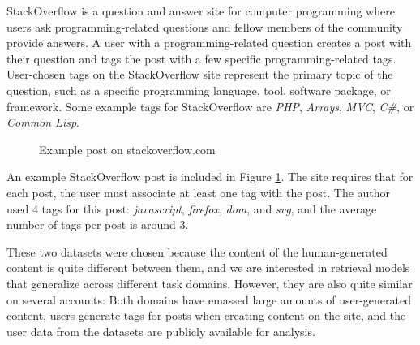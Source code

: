 \documentclass[man,floatsintext]{apa6}
\begin{document}
StackOverflow is a question and answer site for computer programming where users ask programming-related questions and fellow members of the community provide answers.
A user with a programming-related question creates a post with their question and tags the post with a few specific programming-related tags. 
User-chosen tags on the StackOverflow site represent the primary topic of the question, such as a specific programming language, tool, software package, or framework.
Some example tags for StackOverflow are \emph{PHP}, \emph{Arrays}, \emph{MVC}, \emph{C\#}, or \emph{Common Lisp}.

\begin{figure}[!htbp]
  \caption{Example post on stackoverflow.com}
  \label{figSOExample}
\end{figure}

An example StackOverflow post is included in Figure \ref{figSOExample}.
The site requires that for each post, the user must associate at least one tag with the post.
The author used 4 tags for this post: \emph{javascript}, \emph{firefox}, \emph{dom}, and \emph{svg}, and the average number of tags per post is around 3.

These two datasets were chosen because the content of the human-generated content is quite different between them, and we are interested in retrieval models that generalize across different task domains.
However, they are also quite similar on several accounts:
Both domains have emassed large amounts of user-generated content, users generate tags for posts when creating content on the site, and the user data from the datasets are publicly available for analysis.
\end{document}

